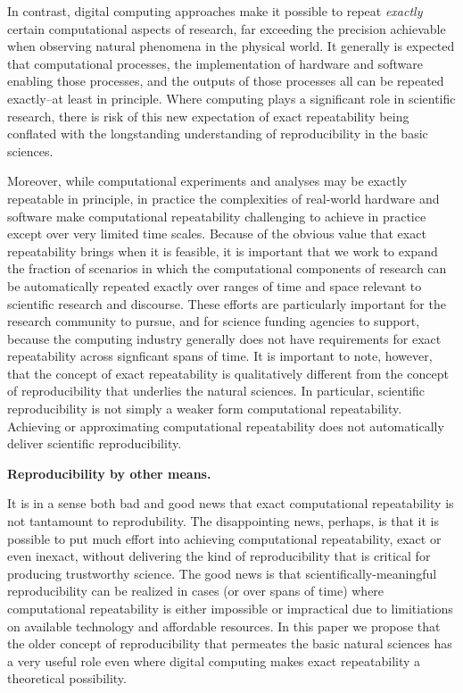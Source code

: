 In contrast, digital computing approaches make it possible to repeat \emph{exactly} certain computational aspects of research,
	 far exceeding the precision achievable when observing natural phenomena in the physical world.  
It generally is expected that computational processes, the implementation of hardware and software 
	enabling those processes, and the outputs of those processes all can be repeated exactly--at least in principle.
Where computing plays a significant role in scientific research, there is risk of this new 
	expectation of exact repeatability being conflated with the longstanding understanding of reproducibility in 
	the basic sciences. 

Moreover, while computational experiments and analyses may be exactly repeatable in principle, 
	in practice the complexities of real-world hardware and software make computational repeatability 
	challenging to achieve in practice except over very limited time scales.
Because of the obvious value that exact repeatability brings when it is feasible, it is important that we work to
	expand the fraction of scenarios in which the computational components of research can be automatically 
	repeated exactly over ranges of time and space relevant to scientific research and discourse.
These efforts are particularly important for the research community to pursue, and for science funding
	agencies to support, because the computing industry generally does not have requirements for exact 
	repeatability across signficant spans of time.
It is important to note, however, that the concept of exact repeatability is 
	qualitatively different from the concept of reproducibility that underlies the natural sciences.
In particular, scientific reproducibility is not simply a weaker form computational repeatability.  
Achieving or approximating computational repeatability does not automatically deliver scientific reproducibility.


\textbf{Reproducibility by other means.}

It is in a sense both bad and good news that exact computational repeatability is not tantamount to reprodubility.
The disappointing news, perhaps, is that it is possible to put much effort into achieving computational repeatability,
	exact or even inexact,
	without delivering the kind of reproducibility that is critical for producing trustworthy science.
The good news is that scientifically-meaningful reproducibility can be realized in cases (or over spans of time)
	where computational repeatability is either impossible or impractical due to limitiations on
	available technology and affordable resources.
In this paper we propose that the older concept of reproducibility that permeates the basic natural sciences has a very
	useful role even where digital computing makes exact repeatability a theoretical possibility.

